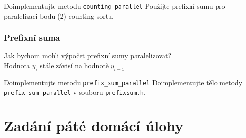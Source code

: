 \documentclass[usenames,dvipsnames,9pt]{beamer}
\begin{document}
{\begin{frame}
\end{frame}

{
\begin{frame}
	\begin{block}{Doimplementujte metodu \texttt{counting\_parallel}}
	    Použijte prefixní sumu pro paralelizaci bodu (2) counting sortu.
    \end{block}
\end{frame}}

{
\begin{frame}
\frametitle{Prefixní suma}

	\begin{center}
		\Large Jak bychom mohli výpočet prefixní sumy paralelizovat? \\
		\large Hodnota $y_i$ stále závisí na hodnotě $y_{i-1}$
	\end{center}

  \begin{block}{Doimplementujte metodu \texttt{prefix\_sum\_parallel}}
    Doimplementujte tělo metody \texttt{prefix\_sum\_parallel} v souboru \texttt{prefixsum.h}.
  \end{block}
\end{frame}
}
}


 \section{Zadání páté domácí úlohy}
 
%
%
%
 
 
\end{document}
